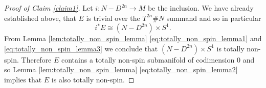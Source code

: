 \begin{proof}[Proof of Claim \ref{claim1}]
	Let $i \colon N- D^{2n} \to M$ be the inclusion. We have already established above, that $E$ is trivial over the $T^{2n} \# N$ summand and so in particular
	\[
	i^\ast E \cong (N- D^{2n}) \times S^1.
	\]
	From Lemma \ref{lem:totally_non_spin_lemma} \ref{eq:totally_non_spin_lemma1} and \ref{eq:totally_non_spin_lemma3} we conclude that $(N- D^{2n}) \times S^1$ is totally non-spin. 
	Therefore $E$ contains a totally non-spin submanifold of codimension $0$ and so Lemma \ref{lem:totally_non_spin_lemma} \ref{eq:totally_non_spin_lemma2} implies that $E$ is also totally non-spin.
\end{proof}

